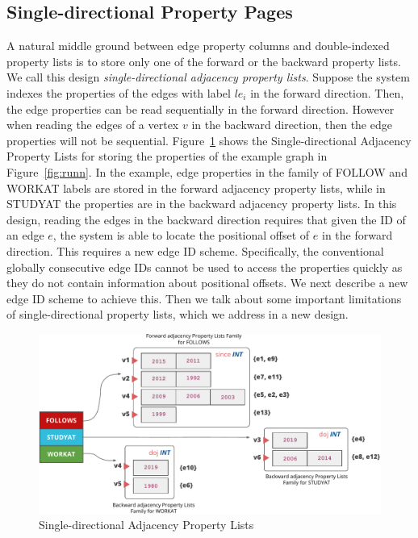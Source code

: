 \subsection{Single-directional Property Pages}

A natural middle ground between edge property columns and double-indexed property lists is to 
store only one of the forward or the backward property lists. We call this design  \emph{single-directional adjacency property lists}. Suppose the system indexes the properties of the edges with label $le_i$ in the forward direction. Then, the edge properties can be read sequentially in the forward direction. However when reading the edges of a vertex $v$ in the backward direction, then the edge properties will not be sequential. Figure~\ref{fig:single-dir-prop-list} shows the Single-directional Adjacency Property Lists for storing the properties of the example graph in Figure~\ref{fig:runn}. In the example, edge properties in the family of FOLLOW and WORKAT labels are stored in the forward adjacency property lists, while in STUDYAT the properties are in the backward adjacency property lists.
In this design, reading the edges in the backward direction requires that given the ID of an edge $e$, the system is able to locate the positional offset of $e$ in the forward direction. This requires a new edge ID scheme. Specifically, the conventional globally consecutive edge IDs cannot be used to access the properties quickly as they do not contain information about positional offsets. We next describe a new edge ID scheme to achieve this. Then we talk about some important limitations of single-directional property lists, which we address in a new design.

\begin{figure}
	\hfill\includegraphics[scale=0.78]{img/single-dir-prop-list}\hspace*{\fill}
	\captionsetup{justification=centering}
	\caption{Single-directional Adjacency Property Lists}
	\label{fig:single-dir-prop-list}
\end{figure}

